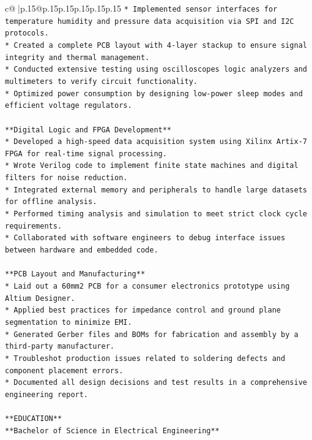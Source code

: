 \documentclass{article}
\begin{document}
{\begin{supertabular}{c@{$\;$}|p{.15\linewidth}@{}p{.15\linewidth}p{.15\linewidth}p{.15\linewidth}p{.15\linewidth}p{.15\linewidth}}
{{{\texttt{*   Implemented sensor interfaces for temperature humidity and pressure data acquisition via SPI and I2C protocols.} \\
\texttt{*   Created a complete PCB layout with 4{-}layer stackup to ensure signal integrity and thermal management.} \\
\texttt{*   Conducted extensive testing using oscilloscopes logic analyzers and multimeters to verify circuit functionality.} \\
\texttt{*   Optimized power consumption by designing low{-}power sleep modes and efficient voltage regulators.} \\
\\ 
\texttt{**Digital Logic and FPGA Development**} \\
\texttt{*   Developed a high{-}speed data acquisition system using Xilinx Artix{-}7 FPGA for real{-}time signal processing.} \\
\texttt{*   Wrote Verilog code to implement finite state machines and digital filters for noise reduction.} \\
\texttt{*   Integrated external memory and peripherals to handle large datasets for offline analysis.} \\
\texttt{*   Performed timing analysis and simulation to meet strict clock cycle requirements.} \\
\texttt{*   Collaborated with software engineers to debug interface issues between hardware and embedded code.} \\
\\ 
\texttt{**PCB Layout and Manufacturing**} \\
\texttt{*   Laid out a 60mm2 PCB for a consumer electronics prototype using Altium Designer.} \\
\texttt{*   Applied best practices for impedance control and ground plane segmentation to minimize EMI.} \\
\texttt{*   Generated Gerber files and BOMs for fabrication and assembly by a third{-}party manufacturer.} \\
\texttt{*   Troubleshot production issues related to soldering defects and component placement errors.} \\
\texttt{*   Documented all design decisions and test results in a comprehensive engineering report.} \\
\\ 
\texttt{**EDUCATION**} \\
\texttt{**Bachelor of Science in Electrical Engineering**} \\
}}}
\end{supertabular}}
\end{document}
